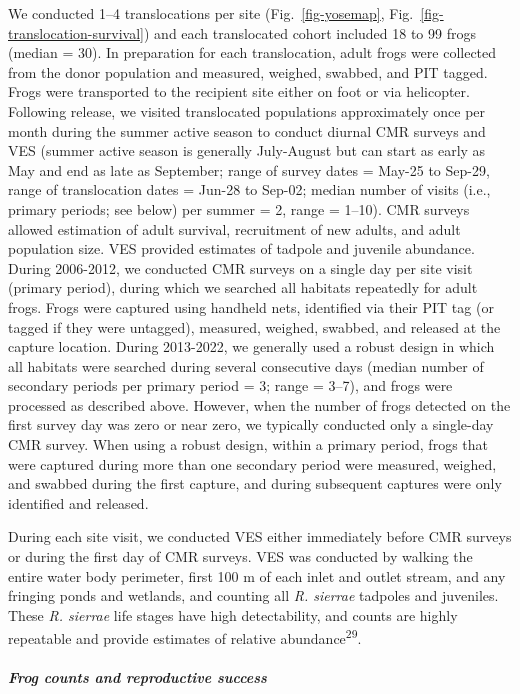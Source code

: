 \documentclass[
  letterpaper,
  DIV=11,
  numbers=noendperiod]{scrartcl}
\let\oldsubparagraph\subparagraph
\renewcommand{\subparagraph}[1]{\oldsubparagraph{#1}\mbox{}}
\begin{document}
We conducted 1--4 translocations per site (Fig.~\ref{fig-yosemap},
Fig.~\ref{fig-translocation-survival}) and each translocated cohort
included 18 to 99 frogs (median = 30). In preparation for each
translocation, adult frogs were collected from the donor population and
measured, weighed, swabbed, and PIT tagged. Frogs were transported to
the recipient site either on foot or via helicopter. Following release,
we visited translocated populations approximately once per month during
the summer active season to conduct diurnal CMR surveys and VES (summer
active season is generally July-August but can start as early as May and
end as late as September; range of survey dates = May-25 to Sep-29,
range of translocation dates = Jun-28 to Sep-02; median number of visits
(i.e., primary periods; see below) per summer = 2, range = 1--10). CMR
surveys allowed estimation of adult survival, recruitment of new adults,
and adult population size. VES provided estimates of tadpole and
juvenile abundance. During 2006-2012, we conducted CMR surveys on a
single day per site visit (primary period), during which we searched all
habitats repeatedly for adult frogs. Frogs were captured using handheld
nets, identified via their PIT tag (or tagged if they were untagged),
measured, weighed, swabbed, and released at the capture location. During
2013-2022, we generally used a robust design in which all habitats were
searched during several consecutive days (median number of secondary
periods per primary period = 3; range = 3--7), and frogs were processed
as described above. However, when the number of frogs detected on the
first survey day was zero or near zero, we typically conducted only a
single-day CMR survey. When using a robust design, within a primary
period, frogs that were captured during more than one secondary period
were measured, weighed, and swabbed during the first capture, and during
subsequent captures were only identified and released.

During each site visit, we conducted VES either immediately before CMR
surveys or during the first day of CMR surveys. VES was conducted by
walking the entire water body perimeter, first 100 m of each inlet and
outlet stream, and any fringing ponds and wetlands, and counting all
\emph{R. sierrae} tadpoles and juveniles. These \emph{R. sierrae} life
stages have high detectability, and counts are highly repeatable and
provide estimates of relative abundance\textsuperscript{29}.

\subparagraph{Frog counts and reproductive
success}\label{frog-counts-and-reproductive-success}
\end{document}
